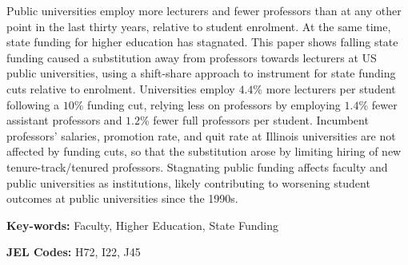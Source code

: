 Public universities employ more lecturers and fewer professors than at any other point in the last thirty years, relative to student enrolment.
At the same time, state funding for higher education has stagnated.
This paper shows falling state funding caused a substitution away from professors towards lecturers at US public universities, using a shift-share approach to instrument for state funding cuts relative to enrolment.
Universities employ $4.4$\% more lecturers per student following a $10$\% funding cut, relying less on professors by employing $1.4$\% fewer assistant professors and $1.2$\% fewer full professors per student.
Incumbent professors' salaries, promotion rate, and quit rate at Illinois universities are not affected by funding cuts, so that the substitution arose by limiting hiring of new tenure-track/tenured professors.
Stagnating public funding affects faculty and public universities as institutions, likely contributing to worsening student outcomes at public universities since the 1990s.

\vfill
\noindent
\textbf{Key-words:}
Faculty,
Higher Education,
State Funding

\vspace{0.05cm}
\noindent
\textbf{JEL Codes:} H72, I22, J45
